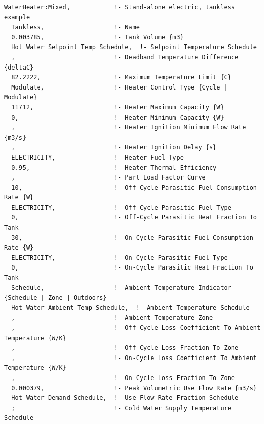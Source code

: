 \begin{lstlisting}
WaterHeater:Mixed,            !- Stand-alone electric, tankless example
  Tankless,                   !- Name
  0.003785,                   !- Tank Volume {m3}
  Hot Water Setpoint Temp Schedule,  !- Setpoint Temperature Schedule
  ,                           !- Deadband Temperature Difference {deltaC}
  82.2222,                    !- Maximum Temperature Limit {C}
  Modulate,                   !- Heater Control Type {Cycle | Modulate}
  11712,                      !- Heater Maximum Capacity {W}
  0,                          !- Heater Minimum Capacity {W}
  ,                           !- Heater Ignition Minimum Flow Rate {m3/s}
  ,                           !- Heater Ignition Delay {s}
  ELECTRICITY,                !- Heater Fuel Type
  0.95,                       !- Heater Thermal Efficiency
  ,                           !- Part Load Factor Curve
  10,                         !- Off-Cycle Parasitic Fuel Consumption Rate {W}
  ELECTRICITY,                !- Off-Cycle Parasitic Fuel Type
  0,                          !- Off-Cycle Parasitic Heat Fraction To Tank
  30,                         !- On-Cycle Parasitic Fuel Consumption Rate {W}
  ELECTRICITY,                !- On-Cycle Parasitic Fuel Type
  0,                          !- On-Cycle Parasitic Heat Fraction To Tank
  Schedule,                   !- Ambient Temperature Indicator {Schedule | Zone | Outdoors}
  Hot Water Ambient Temp Schedule,  !- Ambient Temperature Schedule
  ,                           !- Ambient Temperature Zone
  ,                           !- Off-Cycle Loss Coefficient To Ambient Temperature {W/K}
  ,                           !- Off-Cycle Loss Fraction To Zone
  ,                           !- On-Cycle Loss Coefficient To Ambient Temperature {W/K}
  ,                           !- On-Cycle Loss Fraction To Zone
  0.000379,                   !- Peak Volumetric Use Flow Rate {m3/s}
  Hot Water Demand Schedule,  !- Use Flow Rate Fraction Schedule
  ;                           !- Cold Water Supply Temperature Schedule


\end{lstlisting}
